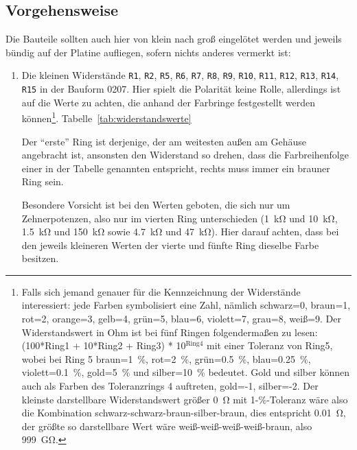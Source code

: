 \documentclass[paper=a4, open=any]{scrbook}
\begin{document}
			\subsection*{Vorgehensweise}
				Die Bauteile sollten auch hier von klein nach groß eingelötet werden und jeweils bündig auf der Platine aufliegen, sofern nichts anderes vermerkt ist:
				\begin{enumerate}
					\item Die kleinen Widerstände \texttt{R1}, \texttt{R2}, \texttt{R5}, \texttt{R6}, \texttt{R7}, \texttt{R8}, \texttt{R9}, \texttt{R10}, \texttt{R11}, \texttt{R12}, \texttt{R13}, \texttt{R14}, \texttt{R15} in der Bauform 0207. Hier spielt die Polarität keine Rolle, allerdings ist auf die Werte zu achten, die anhand der Farbringe festgestellt werden können\footnote{Falls sich jemand genauer für die Kennzeichnung der Widerstände interessiert: jede Farben symbolisiert eine Zahl, nämlich schwarz=0, braun=1, rot=2, orange=3, gelb=4, grün=5, blau=6, violett=7, grau=8, weiß=9. Der Widerstandswert in Ohm ist bei fünf Ringen folgendermaßen zu lesen: (100*Ring1 + 10*Ring2 + Ring3) * 10$^{\text{Ring4}}$ mit einer Toleranz von Ring5, wobei bei Ring 5 braun=\SI{1}{\percent}, rot=\SI{2}{\percent}, grün=\SI{0,5}{\percent}, blau=\SI{0,25}{\percent}, violett=\SI{0,1}{\percent}, gold=\SI{5}{\percent} und silber=\SI{10}{\percent} bedeutet. Gold und silber können auch als Farben des Toleranzrings 4 auftreten, gold=-1, silber=-2. Der kleinste darstellbare Widerstandswert größer \SI{0}{\ohm} mit 1-\%-Toleranz wäre also die Kombination schwarz-schwarz-braun-silber-braun, dies entspricht \SI{0,01}{\ohm}, der größte so darstellbare Wert wäre weiß-weiß-weiß-weiß-braun, also \SI{999}{\giga\ohm}.}. Tabelle~\ref{tab:widerstandswerte}

					      Der \enquote{erste} Ring ist derjenige, der am weitesten außen am Gehäuse angebracht ist, ansonsten den Widerstand so drehen, dass die Farbreihenfolge einer in der Tabelle genannten entspricht, rechts muss immer ein brauner Ring sein.

					      Besondere Vorsicht ist bei den Werten geboten, die sich nur um Zehnerpotenzen, also nur im vierten Ring unterschieden (\SI{1}{\kilo\ohm} und \SI{10}{\kilo\ohm}, \SI{1,5}{\kilo\ohm} und \SI{150}{\kilo\ohm} sowie \SI{4,7}{\kilo\ohm} und \SI{47}{\kilo\ohm}). Hier darauf achten, dass bei den jeweils kleineren Werten der vierte und fünfte Ring dieselbe Farbe besitzen.


\end{enumerate}
\end{document}
